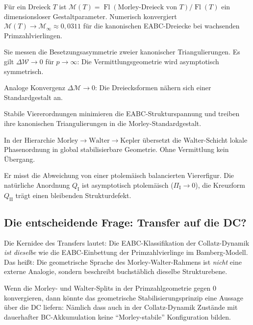 \documentclass[12pt,a4paper]{article}
\newcommand{\Mcal}{\mathcal{M}}      %
\newcommand{\Wcal}{\mathcal{W}}      %
\begin{document}
\begin{description}[leftmargin=2em]
  \item[Morley-Quotient $\Mcal(T)$:]
    Für ein Dreieck $T$ ist $\Mcal(T) = \operatorname{Fl}(\text{Morley-Dreieck von }T) /
    \operatorname{Fl}(T)$ ein dimensionsloser Gestaltparameter.
    Numerisch konvergiert $\Mcal(T) \to \Mcal_\infty \approx 0{,}0311$
    für die kanonischen EABC-Dreiecke bei wachsenden Primzahlvierlingen.

  \item[Walter-Splits $\Delta\Wcal$:]
    Sie messen die Besetzungsasymmetrie zweier kanonischer Triangulierungen.
    Es gilt $\Delta\Wcal \to 0$ für $p \to \infty$: Die Vermittlungsgeometrie
    wird asymptotisch symmetrisch.

  \item[Morley-Splits $\Delta\Mcal$:]
    Analoge Konvergenz $\Delta\Mcal \to 0$: Die Dreiecksformen nähern sich
    einer Standardgestalt an.

  \item[Bamberg-Axiom B-WM-1:]
    Stabile Viererordnungen minimieren die EABC-Strukturspannung und
    treiben ihre kanonischen Triangulierungen in die Morley-Standardgestalt.

  \item[Walter-Schicht als Vermittlungsebene:]
    In der Hierarchie $\text{Morley} \to \text{Walter} \to \text{Kepler}$
    übersetzt die Walter-Schicht lokale Phasenordnung in global
    stabilisierbare Geometrie. Ohne Vermittlung kein Übergang.

  \item[Ptolemäischer Defekt $\Pi$:]
    Er misst die Abweichung von einer ptolemäisch balancierten Viererfigur.
    Die natürliche Anordnung $Q_\mathrm{I}$ ist asymptotisch ptolemäisch
    ($\Pi_\mathrm{I} \to 0$), die Kreuzform $Q_\mathrm{II}$ trägt einen
    bleibenden Strukturdefekt.
\end{description}

\subsection{Die entscheidende Frage: Transfer auf die DC?}

\begin{tcolorbox}[morley]
Die Kernidee des Transfers lautet: Die EABC-Klassifikation der
Collatz-Dynamik \emph{ist dieselbe} wie die EABC-Einbettung der
Primzahlvierlinge im Bamberg-Modell.
Das heißt: Die geometrische Sprache des Morley-Walter-Rahmens
ist \emph{nicht} eine externe Analogie, sondern beschreibt
buchstäblich dieselbe Strukturebene.

Wenn die Morley- und Walter-Splits in der Primzahlgeometrie
gegen $0$ konvergieren, dann könnte das geometrische Stabilisierungsprinzip
eine Aussage über die DC liefern: Nämlich dass auch in der
Collatz-Dynamik Zustände mit dauerhafter BC-Akkumulation
keine ``Morley-stabile'' Konfiguration bilden.
\end{tcolorbox}
\end{document}
